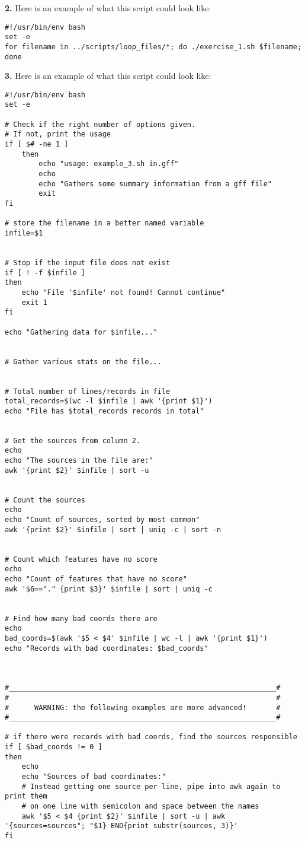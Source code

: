 \documentclass[11pt]{article}
\begin{document}
\textbf{2.} Here is an example of what this script could look like:

\begin{verbatim}
#!/usr/bin/env bash
set -e
for filename in ../scripts/loop_files/*; do ./exercise_1.sh $filename; done
\end{verbatim}

\textbf{3.} Here is an example of what this script could look like:

\begin{verbatim}
#!/usr/bin/env bash
set -e

# Check if the right number of options given.
# If not, print the usage
if [ $# -ne 1 ]
    then
        echo "usage: example_3.sh in.gff"
        echo
        echo "Gathers some summary information from a gff file"
        exit
fi

# store the filename in a better named variable
infile=$1


# Stop if the input file does not exist
if [ ! -f $infile ]
then
    echo "File '$infile' not found! Cannot continue"
    exit 1
fi

echo "Gathering data for $infile..."


# Gather various stats on the file...


# Total number of lines/records in file
total_records=$(wc -l $infile | awk '{print $1}')
echo "File has $total_records records in total"


# Get the sources from column 2.
echo
echo "The sources in the file are:"
awk '{print $2}' $infile | sort -u


# Count the sources
echo
echo "Count of sources, sorted by most common"
awk '{print $2}' $infile | sort | uniq -c | sort -n


# Count which features have no score
echo
echo "Count of features that have no score"
awk '$6=="." {print $3}' $infile | sort | uniq -c


# Find how many bad coords there are
echo
bad_coords=$(awk '$5 < $4' $infile | wc -l | awk '{print $1}')
echo "Records with bad coordinates: $bad_coords"



#_______________________________________________________________#
#                                                               #
#      WARNING: the following examples are more advanced!       #
#_______________________________________________________________#

# if there were records with bad coords, find the sources responsible
if [ $bad_coords != 0 ]
then
    echo
    echo "Sources of bad coordinates:"
    # Instead getting one source per line, pipe into awk again to print them
    # on one line with semicolon and space between the names
    awk '$5 < $4 {print $2}' $infile | sort -u | awk '{sources=sources"; "$1} END{print substr(sources, 3)}'
fi




\end{verbatim}
\end{document}
